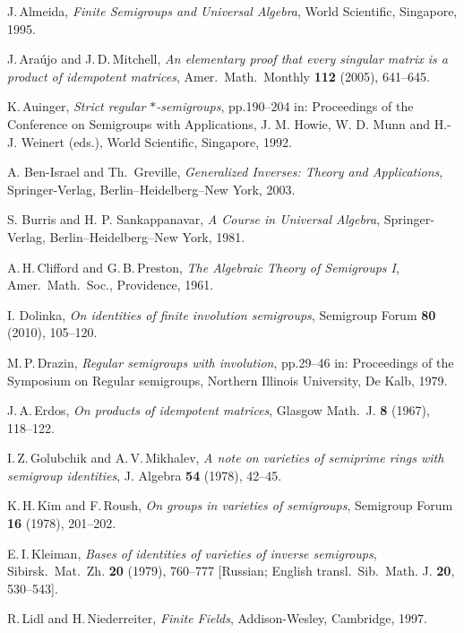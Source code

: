 \documentclass[11pt,reqno]{amsart}
\numberwithin{equation}{section}
\theoremstyle{remark}
\begin{document}
\begin{thebibliography}{99}

J.\,Almeida, \emph{Finite Semigroups and Universal Algebra}, World
Scientific, Singapore, 1995.

J.\,Ara\'ujo and J.\,D.\,Mitchell, \emph{An elementary proof that
every singular matrix is a product of idempotent matrices}, Amer.\
Math.\ Monthly \textbf{112} (2005), 641--645.

K.\,Auinger, \emph{Strict regular $*$-semigroups}, pp.190--204 in:
Proceedings of the Conference on Semigroups with Applications, J.
M. Howie, W. D. Munn and H.-J. Weinert (eds.), World Scientific,
Singapore, 1992.

A. Ben-Israel and Th.\ Greville, \emph{Generalized Inverses:
Theory and Applications}, Springer-Verlag, Berlin--Heidelberg--New
York, 2003.

S. Burris and H. P. Sankappanavar, \emph{A Course in Universal
Algebra}, Springer-Verlag, Berlin--Heidelberg--New York, 1981.

A.\,H.\,Clifford and G.\,B.\,Preston, \emph{The Algebraic Theory
of Semigroups I}, Amer.\ Math.\ Soc., Providence, 1961.

I. Dolinka, \emph{On identities of finite involution semigroups},
Semigroup Forum \textbf{80} (2010), 105--120.

M.\,P.\,Drazin, \emph{Regular semigroups with involution},
pp.29--46 in: Proceedings of the Symposium on Regular semigroups,
Northern Illinois University, De Kalb, 1979.

J.\,A.\,Erdos, \emph{On products of idempotent matrices}, Glasgow
Math.\ J. \textbf{8} (1967), 118--122.

I.\,Z.\,Golubchik and A.\,V.\,Mikhalev, \emph{A note on varieties
of semiprime rings with semigroup identities}, J. Algebra
\textbf{54} (1978), 42--45.

K.\,H.\,Kim and F.\,Roush, \emph{On groups in varieties of
semigroups}, Semigroup Forum \textbf{ 16} (1978), 201--202.

E.\,I.\,Kleiman, \emph{Bases of identities of varieties of inverse
semigroups}, Sibirsk.\ Mat.\ Zh. \textbf{20} (1979), 760--777
[Russian; English transl.\ Sib.\ Math. J. \textbf{20}, 530--543].

R.\,Lidl and H.\,Niederreiter, \emph{Finite Fields},
Addison-Wesley, Cambridge, 1997.


\end{thebibliography}
\end{document}
